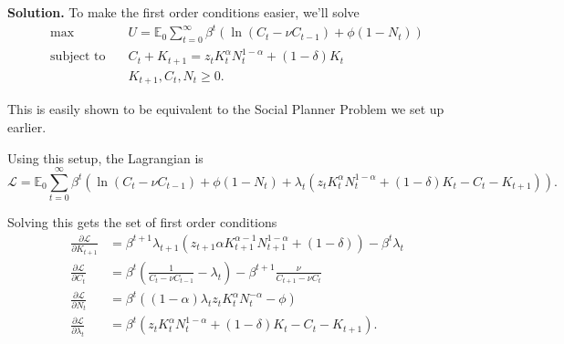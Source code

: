 \documentclass[11pt]{article}
\numberwithin{equation}{section} %
\numberwithin{figure}{section} %
\numberwithin{table}{section} %
\theoremstyle{definition}
\newenvironment{solution}{\begin{addmargin}[2em]{0em} {\bf Solution. }}{\end{addmargin}}
\newcommand{\E}{\mathbb{E}}
\newcommand{\lagr}{\mathcal{L}}
\begin{document}
\begin{solution}
    To make the first order conditions easier, we'll solve
    \begin{alignat*}{4}
        \text{max} \quad & U = \E_0 \sum_{t=0}^\infty \beta^t \left(\ln \left(C_t - \nu C_{t-1}\right) + \phi \left(1 - N_t\right)\right) \\
        \text{subject to} \quad & C_t + K_{t + 1} = z_t K_t^\alpha N_t^{1 - \alpha} + (1 - \delta)K_t \\
        & K_{t+1}, C_t, N_t \geq 0.
    \end{alignat*}

    This is easily shown to be equivalent to the Social Planner Problem we set up earlier.

    Using this setup, the Lagrangian is
    \[
        \lagr = \E_0 \sum_{t=0}^\infty \beta^t \left( \ln \left(C_t - \nu C_{t-1}\right) + \phi \left(1 - N_t\right) + \lambda_t\left(z_t K_t^\alpha N_t^{1 - \alpha} + (1 - \delta)K_t - C_t - K_{t + 1}\right)\right).
    \]

    Solving this gets the set of first order conditions
    \begin{align*}
        \frac{\partial \lagr}{\partial K_{t+1}} &= \beta^{t+1} \lambda_{t+1} \left(z_{t+1} \alpha K_{t+1}^{\alpha-1} N_{t+1}^{1-\alpha} + (1 - \delta)\right) - \beta^t \lambda_t \\
        \frac{\partial \lagr}{\partial C_t} &= \beta^t \left(\frac{1}{C_t - \nu C_{t-1}} - \lambda_t\right) - \beta^{t+1} \frac{\nu}{C_{t+1} - \nu C_t} \\
        \frac{\partial \lagr}{\partial N_t} &= \beta^t \left((1-\alpha) \lambda_t z_t K_t^\alpha N_t^{-\alpha}-\phi \right) \\
        \frac{\partial \lagr}{\partial \lambda_t} &= \beta^t \left(z_t K_t^\alpha N_t^{1 - \alpha} + (1 - \delta)K_t - C_t - K_{t + 1}\right).
    \end{align*}


\end{solution}
\end{document}
